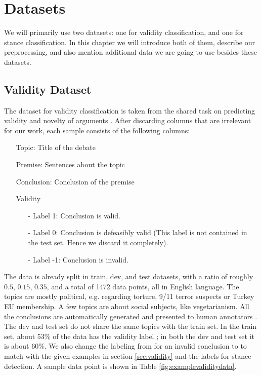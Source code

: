 \section{Datasets}

We will primarily use two datasets: one for validity classification, and one for stance classification. In this chapter we will introduce both of them, describe our preprocessing, and also mention additional data we are going to use besides these datasets.

\subsection{Validity Dataset} \label{sec:validitydata}

The dataset for validity classification is taken from the shared task on predicting validity and novelty of arguments \cite{argsvalidnovel2022}. After discarding columns that are irrelevant for our work, each sample consists of the following columns:
\begin{enumerate}
	\item[\textbullet] Topic: Title of the debate
	\item[\textbullet] Premise: Sentences about the topic
	\item[\textbullet] Conclusion: Conclusion of the premise
	\item[\textbullet] Validity
	\begin{enumerate}
		\item[-] Label 1: Conclusion is valid.
		\item[-] Label 0: Conclusion is defeasibly valid (This label is not contained in the test set. Hence we discard it completely).
		\item[-] Label -1: Conclusion is invalid.
	\end{enumerate}
\end{enumerate}
The data is already split in train, dev, and test datasets, with a ratio of roughly $0.5$, $0.15$, $0.35$, and a total of \num[group-separator={,}]{1472} data points, all in English language. The topics are mostly political, e.g. regarding torture, 9/11 terror suspects or Turkey EU membership. A few topics are about social subjects, like vegetarianism. All the conclusions are automatically generated and presented to human annotators \cite{argsvalidnovel2022}. The dev and test set do not share the same topics with the train set. In the train set, about $53\%$ of the data has the validity label ; in both the dev and test set it is about $60\%$. We also change the labeling from  for an invalid conclusion to  to match with the given examples in section \ref{sec:validity} and the labels for stance detection. A sample data point is shown in Table \ref{fig:examplevaliditydata}.

